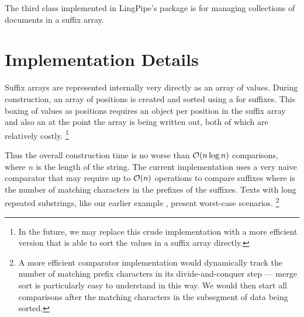 The third class implemented in LingPipe's  package
is for managing collections of documents in a suffix array.




\section{Implementation Details} 

Suffix arrays are represented internally very directly as an array of
 values.  During construction, an array of 
positions is created and sorted using a  for
suffixes.  This boxing of  values as 
positions requires an object per position in the suffix array and also
an  at the point the array is being written out, both of
which are relatively costly.
%
\footnote{In the future, we may replace this crude implementation with
  a more efficient version that is able to sort the  values
  in a suffix array directly.}

Thus the overall construction time is no worse than ${\mathcal O}(n \log n)$
comparisons, where $n$ is the length of the string.  The current
implementation uses a very naive comparator that may require up to
${\mathcal O}(n)$ operations to compare suffixes where  is the number
of matching characters in the prefixes of the suffixes.  Texts
with long repeated substrings, like our earlier example
, present worst-case scenarios.%
%
\footnote{A more efficient comparator implementation would dynamically
track the number of matching prefix characters in its divide-and-conquer
step --- merge sort is particularly easy to understand in this way.  We
would then start all comparisons after the matching characters in the
subsegment of data being sorted.}












